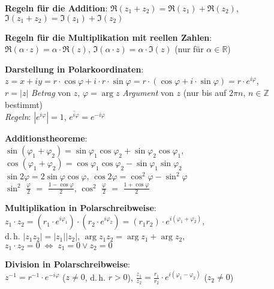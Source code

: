 \textbf{Regeln für die Addition}:
$\Re(z_1 + z_2) = \Re(z_1) + \Re(z_2)$, \quad
$\Im(z_1 + z_2) = \Im(z_1) + \Im(z_2)$

\textbf{Regeln für die Multiplikation mit reellen Zahlen}: \\
$\Re(\alpha \cdot z) = \alpha \cdot \Re(z)$, \quad
$\Im(\alpha \cdot z) = \alpha \cdot \Im(z)$
(nur für $\alpha \in \mathbb{R}$)

\linie

\textbf{Darstellung in Polarkoordinaten}: \\
$z = x + iy = r \cdot \cos{\varphi} + i \cdot r \cdot \sin{\varphi} =
r \cdot (\cos{\varphi} + i \cdot \sin{\varphi}) = r \cdot e^{i\varphi}$, \\
$r = |z|$ \emph{Betrag} von $z$, $\varphi = \arg{z}$
\emph{Argument} von $z$ (nur bis auf $2 \pi n$, $n \in \mathbb{Z}$ bestimmt) \\
\emph{Regeln}: $|e^{i\varphi}| = 1$, $\overline{e^{i\varphi}} = e^{-i\varphi}$

\textbf{Additionstheoreme}: \\
$\sin(\varphi_1 + \varphi_2) =
\sin \varphi_1  \cos \varphi_2  + \sin \varphi_2  \cos \varphi_1$, \quad
$\cos(\varphi_1 + \varphi_2) =
\cos \varphi_1  \cos \varphi_2  - \sin \varphi_1  \sin \varphi_2$ \\
$\sin 2\varphi  = 2 \sin \varphi \cos \varphi$, \quad
$\cos 2\varphi  = \cos^2 \varphi - \sin^2 \varphi$ \\
$\sin^2$ {\Large $\frac{\varphi}{2}$} $=$
{\Large $\frac{1 - \cos{\varphi}}{2}$}, \quad
$\cos^2$ {\Large $\frac{\varphi}{2}$} $=$
{\Large $\frac{1 + \cos{\varphi}}{2}$}

\textbf{Multiplikation in Polarschreibweise}:
$z_1 \cdot z_2 = (r_1 \cdot e^{i\varphi_1}) \cdot (r_2 \cdot e^{i\varphi_2}) =
(r_1 r_2) \cdot e^{i(\varphi_1 + \varphi_2)}$, \\
d.\,h. $|z_1 z_2| = |z_1| |z_2|$,
$\arg{z_1 z_2} = \arg{z_1} + \arg{z_2}$, \\
$z_1 \cdot z_2 = 0 \;\Leftrightarrow\; z_1 = 0 \lor z_2 = 0$

\textbf{Division in Polarschreibweise}: \\
$z^{-1} = r^{-1} \cdot e^{-i\varphi}$ ($z \not= 0$, d.\,h. $r > 0$), \qquad
$\frac{z_1}{z_2} = \frac{r_1}{r_2} \cdot e^{i(\varphi_1 - \varphi_2)}$
($z_2 \not= 0$)

\linie

